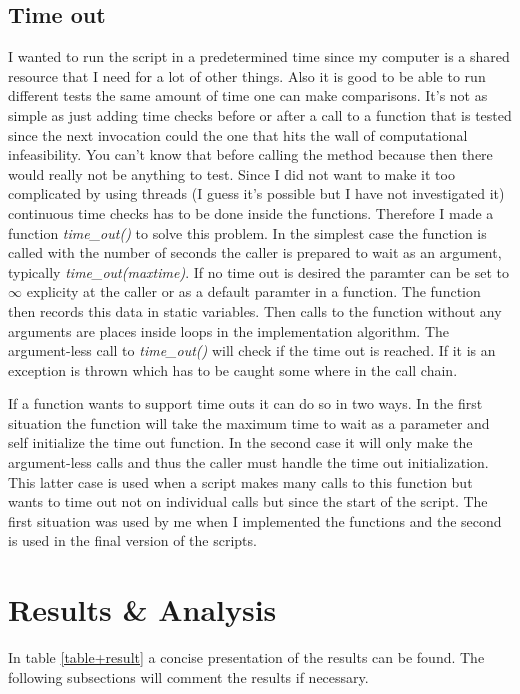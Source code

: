 \documentclass[10pt, a4paper]{article}
\begin{document}
\subsection{Time out}
I wanted to run the script in a predetermined time since my computer is a shared resource that I need for a lot of other things. Also it is good to be able to run different tests the same amount of time one can make comparisons. It's not as simple as just adding time checks before or after a call to a function that is tested since the next invocation could the one that hits the wall of computational infeasibility. You can't know that before calling the method because then there would really not be anything to test. Since I did not want to make it too complicated by using threads (I guess it's possible but I have not investigated it) continuous time checks has to be done inside the functions. Therefore I made a function \emph{time\_out()} to solve this problem. In the simplest case the function is called with the number of seconds the caller is prepared to wait as an argument, typically \emph{time\_out(maxtime)}. If no time out is desired the paramter can be set to $\infty$ explicity at the caller or as a default paramter in a function. The function then records this data in static variables. Then calls to the function without any arguments are places inside loops in the implementation algorithm. The argument-less call to \emph{time\_out()} will check if the time out is reached. If it is an exception is thrown which has to be caught some where in the call chain.

If a function wants to support time outs it can do so in two ways. In the first situation the function will take the maximum time to wait as a parameter and self initialize the time out function. In the second case it will only make the argument-less calls and thus the caller must handle the time out initialization. This latter case is used when a script makes many calls to this function but wants to time out not on individual calls but since the start of the script. The first situation was used by me when I implemented the functions and the second is used in the final version of the scripts.

\section{Results \& Analysis}
In table \ref{table+result} a concise presentation of the results can be found. The following subsections will comment the results if necessary.
\end{document}
